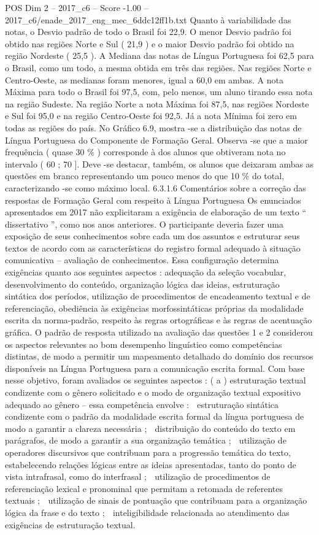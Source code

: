 \begin{textsample}{POS Dim 2 – 2017\_c6 – Score -1.00 – 2017\_c6/enade\_2017\_eng\_mec\_6ddc12ff1b.txt}
Quanto à variabilidade das notas, o Desvio padrão de todo o Brasil foi 22,9.
O menor Desvio padrão foi obtido nas regiões Norte e Sul ( 21,9 ) e o maior Desvio padrão foi obtido na região Nordeste ( 25,5 ).
A Mediana das notas de Língua Portuguesa foi 62,5 para o Brasil, como um todo, a mesma obtida em três das regiões.
Nas regiões Norte e Centro-Oeste, as medianas foram menores, igual a 60,0 em ambas.
A nota Máxima para todo o Brasil foi 97,5, com, pelo menos, um aluno tirando essa nota na região Sudeste.
Na região Norte a nota Máxima foi 87,5, nas regiões Nordeste e Sul foi 95,0 e na região Centro-Oeste foi 92,5.
Já a nota Mínima foi zero em todas as regiões do país.
No Gráfico 6.9, mostra -se a distribuição das notas de Língua Portuguesa do Componente de Formação Geral.
Observa -se que a maior frequência ( quase 30 \% ) corresponde à dos alunos que obtiveram nota no intervalo ( 60 ; 70 ].
Deve -se destacar, também, os alunos que deixaram ambas as questões em branco representando um pouco menos do que 10 \% do total, caracterizando -se como máximo local. 6.3.1.6 Comentários sobre a correção das respostas de Formação Geral com respeito à Língua Portuguesa Os enunciados apresentados em 2017 não explicitaram a exigência de elaboração de um texto “ dissertativo ”, como nos anos anteriores.
O participante deveria fazer uma exposição de seus conhecimentos sobre cada um dos assuntos e estruturar seus textos de acordo com as características do registro formal adequado à situação comunicativa – avaliação de conhecimentos.
Essa configuração determina exigências quanto aos seguintes aspectos : adequação da seleção vocabular, desenvolvimento do conteúdo, organização lógica das ideias, estruturação sintática dos períodos, utilização de procedimentos de encadeamento textual e de referenciação, obediência às exigências morfossintáticas próprias da modalidade escrita da norma-padrão, respeito às regras ortográficas e às regras de acentuação gráfica.
O padrão de resposta utilizado na avaliação das questões 1 e 2 considerou os aspectos relevantes ao bom desempenho linguístico como competências distintas, de modo a permitir um mapeamento detalhado do domínio dos recursos disponíveis na Língua Portuguesa para a comunicação escrita formal.
Com base nesse objetivo, foram avaliados os seguintes aspectos : ( a ) estruturação textual condizente com o gênero solicitado e o modo de organização textual expositivo adequado ao gênero – essa competência envolve :  estruturação sintática condizente com o padrão da modalidade escrita formal da língua portuguesa de modo a garantir a clareza necessária ;  distribuição do conteúdo do texto em parágrafos, de modo a garantir a sua organização temática ;  utilização de operadores discursivos que contribuam para a progressão temática do texto, estabelecendo relações lógicas entre as ideias apresentadas, tanto do ponto de vista intrafrasal, como do interfrasal ;  utilização de procedimentos de referenciação lexical e pronominal que permitam a retomada de referentes textuais ;  utilização de sinais de pontuação que contribuam para a organização lógica da frase e do texto ;  inteligibilidade relacionada ao atendimento das exigências de estruturação textual.

\end{textsample}

